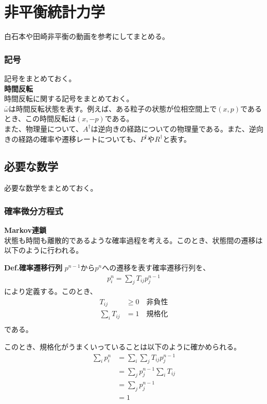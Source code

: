 \documentclass[a4paper,11pt]{jsarticle}
\numberwithin{equation}{section}
\begin{document}
\section{非平衡統計力学}
白石本や田崎非平衡の動画を参考にしてまとめる。\\
\subsubsection{記号}
記号をまとめておく。\\

\textbf{時間反転}\\
時間反転に関する記号をまとめておく。\\
$\bar{\omega}$は時間反転状態を表す。例えば、ある粒子の状態が位相空間上で$(x,p)$であるとき、この時間反転は$(x,-p)$である。\\
また、物理量について、$A^{\dagger}$は逆向きの経路についての物理量である。また、逆向きの経路の確率や遷移レートについても、$P^{\dagger}$や$R^{\dagger}$と表す。\\
\subsection{必要な数学}
必要な数学をまとめておく。\\


\subsubsection{確率微分方程式}
\textbf{Markov連鎖}\\
状態も時間も離散的であるような確率過程を考える。このとき、状態間の遷移は以下のように行われる。
\begin{itembox}[l]{\textbf{Def.確率遷移行列}}
  $p^{n-1}$から$p^{n}$への遷移を表す確率遷移行列を、
  \begin{align}
    p^{n}_i = \sum_{j}T_{ij}p^{n-1}_j
  \end{align}
  により定義する。このとき、
  \begin{align}
    T_{ij} &\geq 0 \quad \text{非負性}\\
    \sum_{i}T_{ij} &= 1 \quad \text{規格化}\\
  \end{align}
  である。
\end{itembox}
このとき、規格化がうまくいっていることは以下のように確かめられる。\\
\begin{align}
  \sum_{i}p^{n}_i &= \sum_{i}\sum_{j}T_{ij}p^{n-1}_j\\
  &= \sum_{j}p^{n-1}_j\sum_{i}T_{ij}\\
  &= \sum_{j}p^{n-1}_j\\
  &= 1
\end{align}
\end{document}
